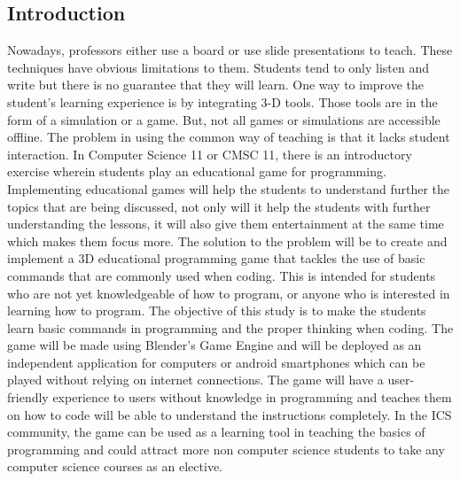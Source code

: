 \documentclass[journal]{./IEEE/IEEEtran}
\newcommand{\tab} [1][0.5cm]{\hspace*{#1}}
\begin{document}
\begin{justify}
\section{\textbf{Introduction}} Nowadays, professors either use a board or use slide presentations to teach. These techniques have obvious limitations to them. Students tend to only listen and write but there is no guarantee that they will learn. One way to improve the student's learning experience is by integrating 3-D tools. Those tools are in the form of a simulation or a game. But, not all games or simulations are accessible offline. The problem in using the common way of teaching is that it lacks student interaction. In Computer Science 11 or CMSC 11, there is an introductory exercise wherein students play an educational game for programming. Implementing educational games will help the students to understand further the topics that are being discussed, not only will it help the students with further understanding the lessons, it will also give them entertainment at the same time which makes them focus more.\newline
\tab The solution to the problem will be to create and implement a 3D educational programming game that tackles the use of basic commands that are commonly used when coding. This is intended for students who are not yet knowledgeable of how to program, or anyone who is interested in learning how to program. The objective of this study is to make the students learn basic commands in programming and the proper thinking when coding. The game will be made using Blender's Game Engine and will be deployed as an independent application for computers or android smartphones which can be played without relying on internet connections. The game will have a user-friendly experience to users without knowledge in programming and teaches them on how to code will be able to understand the instructions completely. In the ICS community, the game can be used as a learning tool in teaching the basics of programming and could attract more non computer science students to take any computer science courses as an elective.


\end{justify}
\end{document}
